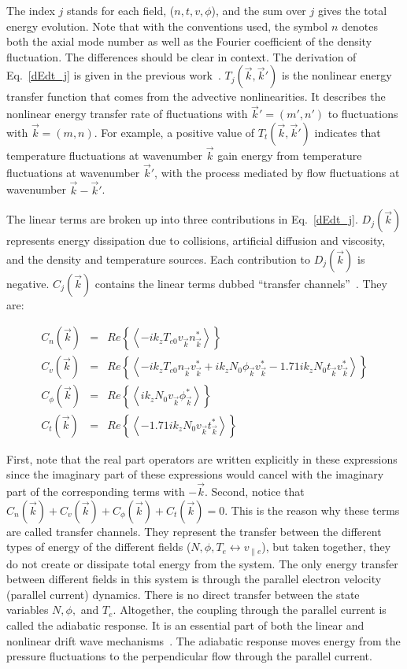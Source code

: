 \documentclass[showpacs,preprintnumbers,amsmath,amssymb,superscriptaddress,aip]{revtex4-1}
\def\beqar{\begin{eqnarray}}
\def\eeqar{\end{eqnarray}}
\def\para{\parallel}
\begin{document}
The index $j$ stands for each field, ($n,t,v,\phi$), and the sum over $j$ gives the total energy evolution. 
Note that with the conventions used, the symbol $n$ denotes both the axial mode number as
well as the Fourier coefficient of the density fluctuation. The differences should be clear in context. The derivation of Eq.~\ref{dEdt_j} 
is given in the previous work~\cite{friedman2012b}. $T_{j}(\vec{k},\vec{k}')$ is the nonlinear energy transfer function that comes from the advective
nonlinearities.  It describes the nonlinear energy transfer rate of fluctuations with $\vec{k}'=(m',n')$ to fluctuations with $\vec{k}=(m,n)$. 
For example, a positive value of $T_{t}(\vec{k},\vec{k}')$ indicates that temperature fluctuations
at wavenumber $\vec{k}$ gain energy from temperature fluctuations at wavenumber $\vec{k}'$, with the process mediated by flow fluctuations at wavenumber $\vec{k}-\vec{k}'$.

The linear terms are broken up into three contributions in Eq.~\ref{dEdt_j}.
$D_{j}(\vec{k})$ represents energy dissipation due to collisions, artificial diffusion and viscosity, and the density and temperature sources.
Each contribution to $D_j(\vec{k})$ is negative. 
$C_j(\vec{k})$ contains the linear terms dubbed ``transfer channels''~\cite{scott2002}. They are:

\beqar
C_n(\vec{k}) & = & Re \left\{ \left< - i k_z T_{e0} v_{\vec{k}} n_{\vec{k}}^* \right> \right\}
\label{Cnk} \\
C_v(\vec{k}) & = & Re \left\{ \left< - i k_z T_{e0} n_{\vec{k}} v_{\vec{k}}^* + i k_z N_0 \phi_{\vec{k}} v_{\vec{k}}^*  - 1.71 i k_z N_0 t_{\vec{k}} v_{\vec{k}}^*  \right> \right\}
\label{Cvk} \\
C_\phi(\vec{k}) & = & Re \left\{ \left< i k_z N_0 v_{\vec{k}} \phi_{\vec{k}}^* \right> \right\}
\label{Cpk} \\
C_t(\vec{k}) & = & Re \left\{ \left< - 1.71 i k_z N_0 v_{\vec{k}} t_{\vec{k}}^* \right> \right\}
\label{Ctk}
\eeqar

First, note that the real part operators are written explicitly in these expressions since the imaginary part of these expressions would cancel with the imaginary part of the 
corresponding terms with $-\vec{k}$. Second, notice that $C_n(\vec{k}) + C_v(\vec{k}) + C_\phi(\vec{k}) + C_t(\vec{k}) = 0$.
This is the reason why these terms are called transfer channels. They represent the transfer
between the different types of energy of the different fields ($N,\phi,T_e \leftrightarrow v_{\para e}$), but taken together, they do not create or dissipate total
energy from the system. The only energy transfer between different fields in this system is through the parallel electron velocity (parallel current) dynamics. There is no direct transfer between
the state variables $N, \phi,$ and $T_e$.  Altogether, the coupling through the parallel current is called the
adiabatic response. It is an essential part of both the linear and nonlinear
drift wave mechanisms~\cite{scott2002,scott2005}. The adiabatic response moves energy from the pressure fluctuations to the perpendicular flow through the parallel current.
\end{document}
